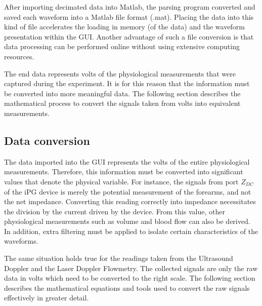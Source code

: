 After importing decimated data into Matlab, the parsing program converted and saved each waveform into a Matlab file format (.mat). Placing the data into this kind of file accelerates the loading in memory (of the data) and the waveform presentation within the GUI. Another advantage of such a file conversion is that data processing can be performed online without using extensive computing resources. 

The end data represents volts of the physiological measurements that were captured during the experiment. It is for this reason that the information must be converted into more meaningful data. The following section describes the mathematical process to convert the signals taken from volts into equivalent measurements.

\subsection{Data conversion}
\label{section procedure data conversion}
The data imported into the GUI represents the volts of the entire physiological measurements. Therefore, this information must be converted into significant values that denote the physical variable. For instance, the signals from port $Z_{DC}$ of the iPG device is merely the potential measurement of the forearms, and not the net impedance. Converting this reading correctly into impedance necessitates the division by the current driven by the device. From this value, other physiological measurements such as volume and blood flow can also be derived. In addition, extra filtering must be applied to isolate certain characteristics of the waveforms. 

The same situation holds true for the readings taken from the Ultrasound Doppler and the Laser Doppler Flowmetry. The collected signals are only the raw data in volts which need to be converted to the right scale. The following section describes the mathematical equations and tools used to convert the raw signals effectively in greater detail.

